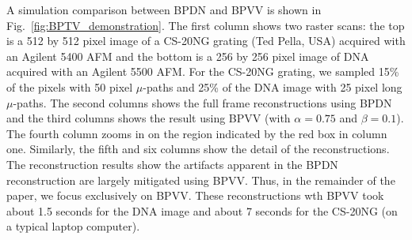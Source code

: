\documentclass[journal]{IEEEtran}
\begin{document}



A simulation comparison between BPDN and BPVV is shown in
Fig.~\ref{fig:BPTV_demonstration}. The first column shows two raster
scans: the top is a 512 by 512 pixel image of a CS-20NG grating (Ted Pella, USA) acquired
with an Agilent 5400 AFM and the bottom is a 256 by 256 pixel image of
DNA acquired with an Agilent 5500 AFM. For the CS-20NG grating, we
sampled 15\% of the pixels with 50 pixel $\mu$-paths and 25\%
of the DNA image with 25 pixel long $\mu$-paths. The second columns
shows the full frame reconstructions using BPDN and the third columns
shows the result using BPVV (with $\alpha = 0.75$ and $\beta = 0.1$). The fourth column zooms in on the region
indicated by the red box in column one. Similarly, the fifth and six
columns show the detail of the reconstructions. The reconstruction
results show the artifacts apparent in the BPDN reconstruction are
largely mitigated using BPVV. Thus, in the remainder of the paper, we
focus exclusively on BPVV. These reconstructions wth BPVV took about
1.5 seconds for the DNA image and about 7 seconds for the
CS-20NG (on a typical laptop computer).
	

\end{document}
